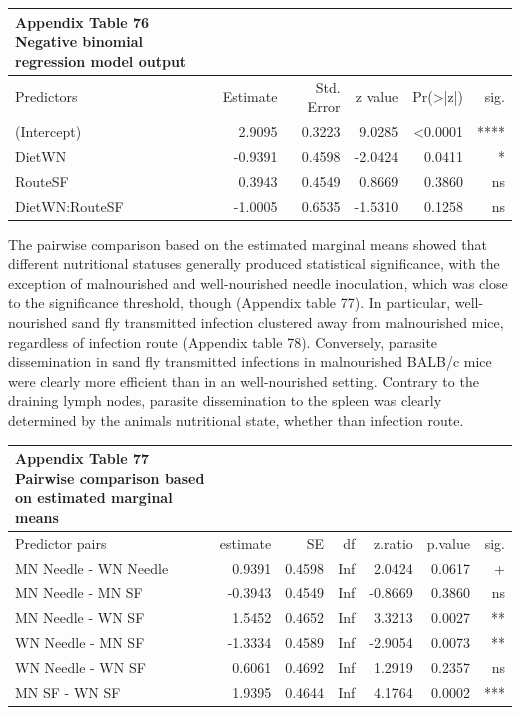 \documentclass[
  12pt,
  letterpaper,
]{article}
\begin{document}
\begin{longtable}{l|rrrrr}
\caption*{
{\large \textbf{Appendix Table 76}} \\ 
{\small \textbf{Negative binomial regression model output}}
} \\ 
\toprule
\multicolumn{1}{l}{Predictors} & Estimate & Std. Error & z value & Pr(>|z|) & sig. \\ 
\midrule\addlinespace[2.5pt]
(Intercept) & 2.9095 & 0.3223 & 9.0285 & <0.0001 & **** \\ 
DietWN & -0.9391 & 0.4598 & -2.0424 & 0.0411 & * \\ 
RouteSF & 0.3943 & 0.4549 & 0.8669 & 0.3860 & ns \\ 
DietWN:RouteSF & -1.0005 & 0.6535 & -1.5310 & 0.1258 & ns \\ 
\bottomrule
\end{longtable}

The pairwise comparison based on the estimated marginal means showed that different nutritional statuses generally produced statistical significance, with the exception of malnourished and well-nourished needle inoculation, which was close to the significance threshold, though (Appendix table 77). In particular, well-nourished sand fly transmitted infection clustered away from malnourished mice, regardless of infection route (Appendix table 78). Conversely, parasite dissemination in sand fly transmitted infections in malnourished BALB/c mice were clearly more efficient than in an well-nourished setting. Contrary to the draining lymph nodes, parasite dissemination to the spleen was clearly determined by the animals nutritional state, whether than infection route.

\begin{longtable}{l|rrrrrr}
\caption*{
{\large \textbf{Appendix Table 77}} \\ 
{\small \textbf{Pairwise comparison based on estimated marginal means}}
} \\ 
\toprule
\multicolumn{1}{l}{Predictor pairs} & estimate & SE & df & z.ratio & p.value & sig. \\ 
\midrule\addlinespace[2.5pt]
MN Needle - WN Needle & 0.9391 & 0.4598 & Inf & 2.0424 & 0.0617 & + \\ 
MN Needle - MN SF & -0.3943 & 0.4549 & Inf & -0.8669 & 0.3860 & ns \\ 
MN Needle - WN SF & 1.5452 & 0.4652 & Inf & 3.3213 & 0.0027 & ** \\ 
WN Needle - MN SF & -1.3334 & 0.4589 & Inf & -2.9054 & 0.0073 & ** \\ 
WN Needle - WN SF & 0.6061 & 0.4692 & Inf & 1.2919 & 0.2357 & ns \\ 
MN SF - WN SF & 1.9395 & 0.4644 & Inf & 4.1764 & 0.0002 & *** \\ 
\bottomrule
\end{longtable}
\end{document}
